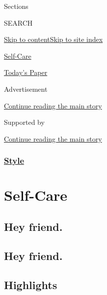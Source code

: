 Sections

SEARCH

\protect\hyperlink{site-content}{Skip to
content}\protect\hyperlink{site-index}{Skip to site index}

\href{https://www.nytimes.com/section/style/self-care/}{Self-Care}

\href{https://myaccount.nytimes.com/auth/login?response_type=cookie\&client_id=vi}{}

\href{https://www.nytimes.com/section/todayspaper}{Today's Paper}

Advertisement

\protect\hyperlink{after-top}{Continue reading the main story}

Supported by

\protect\hyperlink{after-sponsor}{Continue reading the main story}

\hypertarget{style}{%
\subsubsection{\texorpdfstring{\href{/section/style}{Style}}{Style}}\label{style}}

\hypertarget{self-care}{%
\section{Self-Care}\label{self-care}}

\hypertarget{hey-friend}{%
\subsection{Hey friend.}\label{hey-friend}}

\hypertarget{hey-friend-1}{%
\subsection{Hey friend.}\label{hey-friend-1}}

\hypertarget{highlights}{%
\subsection{Highlights}\label{highlights}}

